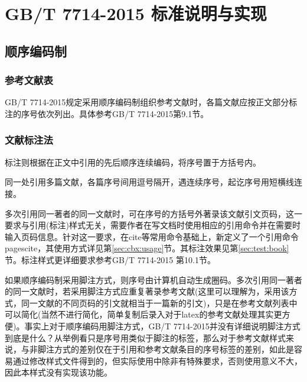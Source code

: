 \begin{enumerate}
%
%
%
%

\end{enumerate}

\section{GB/T 7714-2015 标准说明与实现}

\subsection{顺序编码制}

\subsubsection{参考文献表}\label{sec:bib:serialno}

GB/T 7714-2015规定采用顺序编码制组织参考文献时，各篇文献应按正文部分标注的序号依次列出。具体参考GB/T 7714-2015第9.1节。

\subsubsection{文献标注法}
标注则根据在正文中引用的先后顺序连续编码，将序号置于方括号内。

同一处引用多篇文献，各篇序号间用逗号隔开，遇连续序号，起讫序号用短横线连接。

多次引用同一著者的同一文献时，可在序号的方括号外著录该文献引文页码，这一要求与引用(标注)样式无关，需要作者在写文档时使用相应的引用命令并在需要时输入页码信息。针对这一要求，在cite等常用命令基础上，新定义了一个引用命令pagescite，其使用方式详见第\ref{sec:cbx:usage}节。其标注效果见第\ref{sec:test:book}节。标注样式更详细要求参考GB/T 7714-2015 第10.1节。

如果顺序编码制采用脚注方式，则序号由计算机自动生成圈码。多次引用同一著者的同一文献时，若采用脚注方式应重复著录参考文献(这里可以理解为，采用该方式，同一文献的不同页码的引文就相当于一篇新的引文)，只是在参考文献列表中可以简化(当然不进行简化，简单复制后录入对于latex的参考文献处理其实更方便)。事实上对于顺序编码用脚注方式，GB/T 7714-2015并没有详细说明脚注方式到底是什么？从举例看只是序号用类似于脚注的标签，那么对于参考文献样式来说，与非脚注方式的差别仅在于引用和参考文献条目的序号标签的差别，如此是容易通过修改样式文件得到的，但实际使用中除非有特殊要求，否则使用意义不大，因此本样式没有实现该功能。

